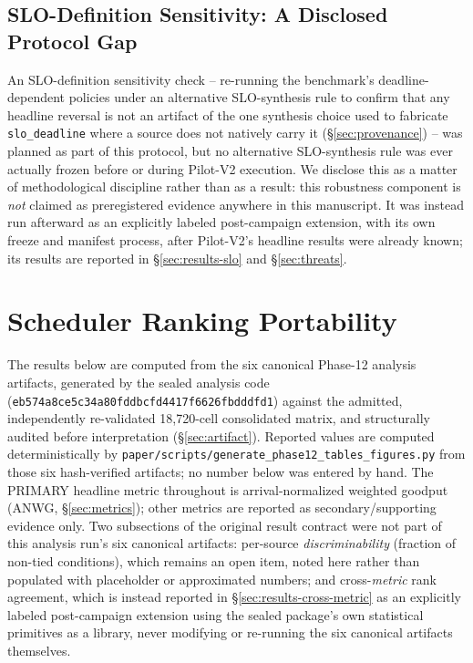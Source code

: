 \documentclass[sn-basic,Numbered,pdflatex]{sn-jnl}
\begin{document}
\subsection{SLO-Definition Sensitivity: A Disclosed Protocol Gap}
\label{sec:slo-sensitivity-gap}

An SLO-definition sensitivity check -- re-running the benchmark's
deadline-dependent policies under an alternative SLO-synthesis rule to
confirm that any headline reversal is not an artifact of the one
synthesis choice used to fabricate \texttt{slo\_deadline} where a source
does not natively carry it (\S\ref{sec:provenance}) -- was planned as part
of this protocol, but no alternative SLO-synthesis rule was ever actually
frozen before or during Pilot-V2 execution. We disclose this as a matter
of methodological discipline rather than as a result: this robustness
component is \emph{not} claimed as preregistered evidence anywhere in
this manuscript. It was instead run afterward as an explicitly labeled
post-campaign extension, with its own freeze and manifest process, after
Pilot-V2's headline results were already known; its results are reported
in \S\ref{sec:results-slo} and \S\ref{sec:threats}.

\section{Scheduler Ranking Portability}
\label{sec:results}

The results below are computed from the six canonical Phase-12 analysis
artifacts, generated by the sealed analysis code
(\texttt{eb574a8ce5c34a80fddbcfd4417f6626fbdddfd1}) against the admitted,
independently re-validated 18{,}720-cell consolidated matrix, and
structurally audited before interpretation
(\S\ref{sec:artifact}). Reported values are computed deterministically by
\texttt{paper/scripts/generate\_phase12\_tables\_figures.py} from those six
hash-verified artifacts; no number below was entered by hand. The PRIMARY
headline metric throughout is arrival-normalized weighted goodput (ANWG,
\S\ref{sec:metrics}); other metrics are reported as secondary/supporting
evidence only. Two subsections of the original result contract were not
part of this analysis run's six canonical artifacts: per-source
\emph{discriminability} (fraction of non-tied conditions), which remains
an open item, noted here rather than populated with placeholder or
approximated numbers; and cross-\emph{metric} rank agreement, which is
instead reported in \S\ref{sec:results-cross-metric} as an explicitly
labeled post-campaign extension using the sealed package's own statistical
primitives as a library, never modifying or re-running the six canonical
artifacts themselves.
\end{document}
